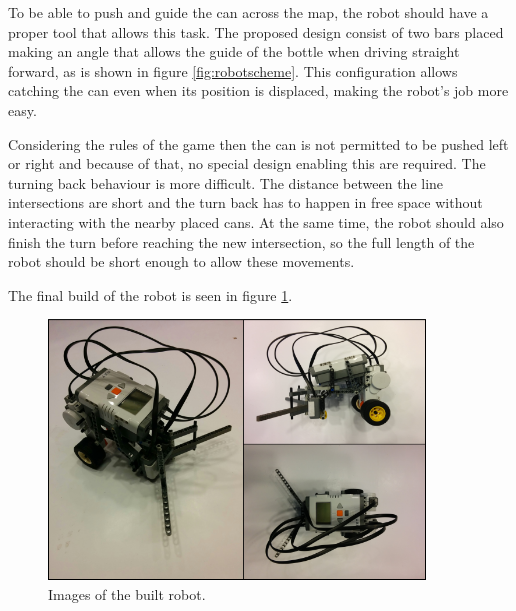 To be able to push and guide the can across the map, the robot should have a proper tool that allows this task. 
The proposed design consist of two bars placed making an angle that allows the guide of the bottle when driving straight forward, as is shown in figure \ref{fig:robotscheme}.
This configuration allows catching the can even when its position is displaced, making the robot's job more easy.

Considering the rules of the game then the can is not permitted to be pushed left or right and because of that, no special design enabling this are required. 
The turning back behaviour is more difficult. 
The distance between the line intersections are short and the turn back has to happen in free space without interacting with the nearby placed cans.
At the same time, the robot should also finish the turn before reaching the new intersection, so the full length of the robot should be short enough to allow these movements.


The final build of the robot is seen in figure \ref{fig:robotImage}.

\begin{figure}[H]
\includegraphics[width=10cm]{Fig1.png}
\centering
\caption{Images of the built robot.}
\label{fig:robotImage}
\end{figure}